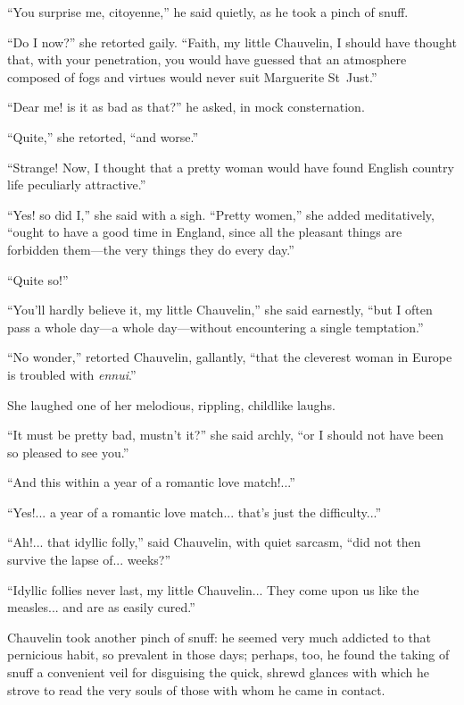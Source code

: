 \enquote{You surprise me, citoyenne,} he said quietly, as he took a pinch of snuff.

\enquote{Do I now?} she retorted gaily. \enquote{Faith, my little Chauvelin, I should have thought that, with your penetration, you would have guessed that an atmosphere composed of fogs and virtues would never suit Marguerite St~Just.}

\enquote{Dear me! is it as bad as that?} he asked, in mock consternation.

\enquote{Quite,} she retorted, \enquote{and worse.}

\enquote{Strange! Now, I thought that a pretty woman would have found English country life peculiarly attractive.}

\enquote{Yes! so did I,} she said with a sigh. \enquote{Pretty women,} she added meditatively, \enquote{ought to have a good time in England, since all the pleasant things are forbidden them---the very things they do every day.}

\enquote{Quite so!}

\enquote{You'll hardly believe it, my little Chauvelin,} she said earnestly, \enquote{but I often pass a whole day---a whole day---without encountering a single temptation.}

\enquote{No wonder,} retorted Chauvelin, gallantly, \enquote{that the cleverest woman in Europe is troubled with \textit{ennui}.}

She laughed one of her melodious, rippling, childlike laughs.

\enquote{It must be pretty bad, mustn't it?} she said archly, \enquote{or I should not have been so pleased to see you.}

\enquote{And this within a year of a romantic love match!...}

\enquote{Yes!... a year of a romantic love match... that's just the difficulty...}

\enquote{Ah!... that idyllic folly,} said Chauvelin, with quiet sarcasm, \enquote{did not then survive the lapse of... weeks?}

\enquote{Idyllic follies never last, my little Chauvelin... They come upon us like the measles... and are as easily cured.}

Chauvelin took another pinch of snuff: he seemed very much addicted to that pernicious habit, so prevalent in those days; perhaps, too, he found the taking of snuff a convenient veil for disguising the quick, shrewd glances with which he strove to read the very souls of those with whom he came in contact.

